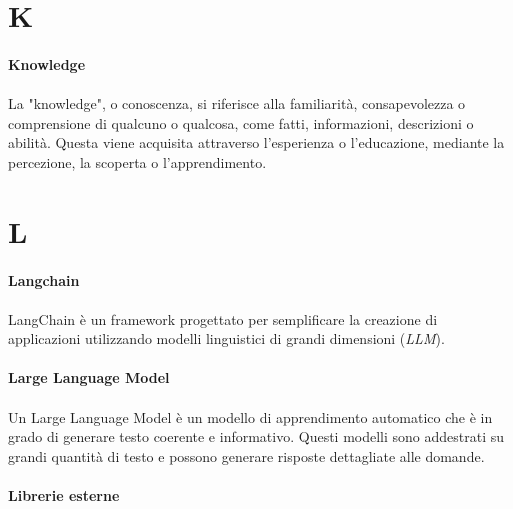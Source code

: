 \documentclass[10pt, a4paper]{article}
\begin{document}
\newpage
\section{K}
\vspace{2em}
\paragraph{Knowledge}\noindent\hrulefill
\paragraph{}La "knowledge", o conoscenza, si riferisce alla familiarità, consapevolezza o comprensione di qualcuno o qualcosa, come fatti, informazioni, descrizioni o abilità. Questa viene acquisita attraverso l’esperienza o l’educazione, mediante la percezione, la scoperta o l’apprendimento.



\newpage
\section{L}
\vspace{2em}
\paragraph{Langchain}\noindent\hrulefill
\paragraph{}LangChain è un framework progettato per semplificare la creazione di applicazioni utilizzando modelli linguistici di grandi dimensioni (\textit{LLM\pg}).

\vspace{2em}
\paragraph{Large Language Model}\noindent\hrulefill
\paragraph{}Un Large Language Model è un modello di apprendimento automatico che è in grado di generare testo coerente e informativo. Questi modelli sono addestrati su grandi quantità di testo e possono generare risposte dettagliate alle domande.

\vspace{2em}
\paragraph{Librerie esterne}\noindent\hrulefill
\end{document}
